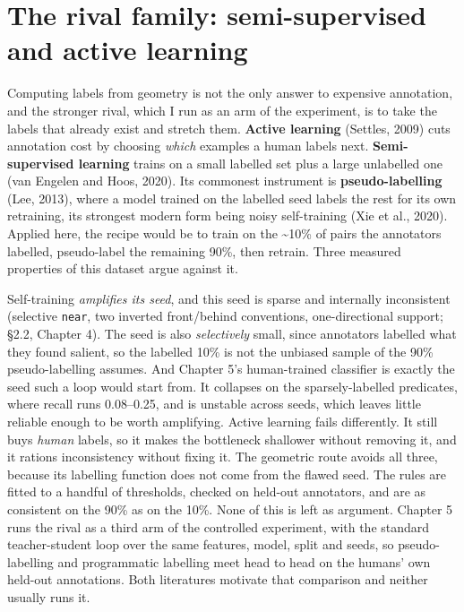 \section{The rival family: semi-supervised and active learning}

Computing labels from geometry is not the only answer to expensive annotation, and the stronger rival, which I run as an arm of the experiment, is to take the labels that already exist and stretch them. \textbf{Active learning} (Settles, 2009) cuts annotation cost by choosing \textit{which} examples a human labels next. \textbf{Semi-supervised learning} trains on a small labelled set plus a large unlabelled one (van Engelen and Hoos, 2020). Its commonest instrument is \textbf{pseudo-labelling} (Lee, 2013), where a model trained on the labelled seed labels the rest for its own retraining, its strongest modern form being noisy self-training (Xie et al., 2020). Applied here, the recipe would be to train on the \textasciitilde{}10\% of pairs the annotators labelled, pseudo-label the remaining 90\%, then retrain. Three measured properties of this dataset argue against it.

Self-training \textit{amplifies its seed}, and this seed is sparse and internally inconsistent (selective \texttt{near}, two inverted front/behind conventions, one-directional support; \S{}2.2, Chapter 4). The seed is also \textit{selectively} small, since annotators labelled what they found salient, so the labelled 10\% is not the unbiased sample of the 90\% pseudo-labelling assumes. And Chapter 5's human-trained classifier is exactly the seed such a loop would start from. It collapses on the sparsely-labelled predicates, where recall runs 0.08--0.25, and is unstable across seeds, which leaves little reliable enough to be worth amplifying. Active learning fails differently. It still buys \textit{human} labels, so it makes the bottleneck shallower without removing it, and it rations inconsistency without fixing it. The geometric route avoids all three, because its labelling function does not come from the flawed seed. The rules are fitted to a handful of thresholds, checked on held-out annotators, and are as consistent on the 90\% as on the 10\%. None of this is left as argument. Chapter 5 runs the rival as a third arm of the controlled experiment, with the standard teacher-student loop over the same features, model, split and seeds, so pseudo-labelling and programmatic labelling meet head to head on the humans' own held-out annotations. Both literatures motivate that comparison and neither usually runs it.

